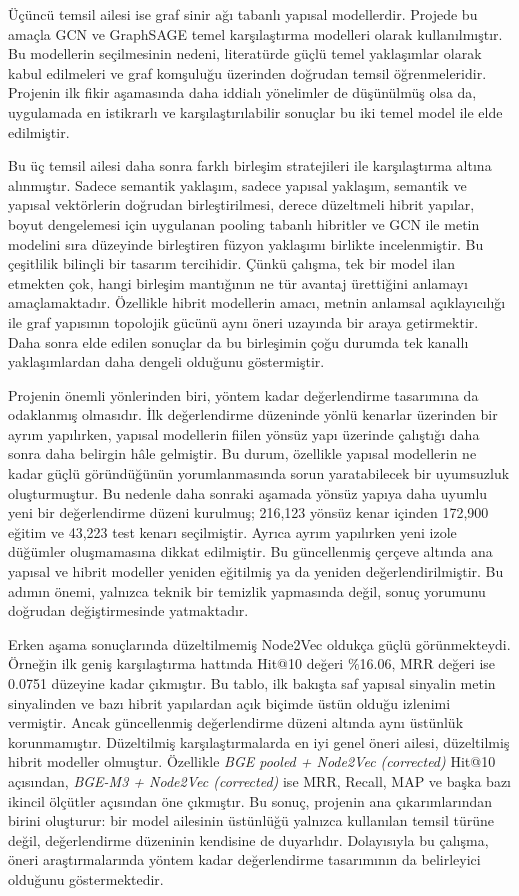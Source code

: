 Üçüncü temsil ailesi ise graf sinir ağı tabanlı yapısal modellerdir.
Projede bu amaçla GCN ve GraphSAGE temel karşılaştırma modelleri olarak
kullanılmıştır. Bu modellerin seçilmesinin nedeni, literatürde güçlü temel
yaklaşımlar olarak kabul edilmeleri ve graf komşuluğu üzerinden doğrudan
temsil öğrenmeleridir. Projenin ilk fikir aşamasında daha iddialı yönelimler
de düşünülmüş olsa da, uygulamada en istikrarlı ve karşılaştırılabilir sonuçlar
bu iki temel model ile elde edilmiştir.

Bu üç temsil ailesi daha sonra farklı birleşim stratejileri ile karşılaştırma
altına alınmıştır. Sadece semantik yaklaşım, sadece yapısal yaklaşım, semantik
ve yapısal vektörlerin doğrudan birleştirilmesi, derece düzeltmeli hibrit
yapılar, boyut dengelemesi için uygulanan pooling tabanlı hibritler ve GCN ile
metin modelini sıra düzeyinde birleştiren füzyon yaklaşımı birlikte
incelenmiştir. Bu çeşitlilik bilinçli bir tasarım tercihidir. Çünkü çalışma,
tek bir model ilan etmekten çok, hangi birleşim mantığının ne tür avantaj
ürettiğini anlamayı amaçlamaktadır. Özellikle hibrit modellerin amacı, metnin
anlamsal açıklayıcılığı ile graf yapısının topolojik gücünü aynı öneri
uzayında bir araya getirmektir. Daha sonra elde edilen sonuçlar da bu
birleşimin çoğu durumda tek kanallı yaklaşımlardan daha dengeli olduğunu
göstermiştir.

Projenin önemli yönlerinden biri, yöntem kadar değerlendirme tasarımına da
odaklanmış olmasıdır. İlk değerlendirme düzeninde yönlü kenarlar üzerinden bir
ayrım yapılırken, yapısal modellerin fiilen yönsüz yapı üzerinde çalıştığı daha
sonra daha belirgin hâle gelmiştir. Bu durum, özellikle yapısal modellerin ne
kadar güçlü göründüğünün yorumlanmasında sorun yaratabilecek bir uyumsuzluk
oluşturmuştur. Bu nedenle daha sonraki aşamada yönsüz yapıya daha uyumlu yeni
bir değerlendirme düzeni kurulmuş; 216,123 yönsüz kenar içinden 172,900 eğitim
ve 43,223 test kenarı seçilmiştir. Ayrıca ayrım yapılırken yeni izole düğümler
oluşmamasına dikkat edilmiştir. Bu güncellenmiş çerçeve altında ana yapısal ve
hibrit modeller yeniden eğitilmiş ya da yeniden değerlendirilmiştir. Bu adımın
önemi, yalnızca teknik bir temizlik yapmasında değil, sonuç yorumunu doğrudan
değiştirmesinde yatmaktadır.

Erken aşama sonuçlarında düzeltilmemiş Node2Vec oldukça güçlü görünmekteydi.
Örneğin ilk geniş karşılaştırma hattında Hit@10 değeri \%16.06, MRR değeri ise
0.0751 düzeyine kadar çıkmıştır. Bu tablo, ilk bakışta saf yapısal sinyalin
metin sinyalinden ve bazı hibrit yapılardan açık biçimde üstün olduğu izlenimi
vermiştir. Ancak güncellenmiş değerlendirme düzeni altında aynı üstünlük
korunmamıştır. Düzeltilmiş karşılaştırmalarda en iyi genel öneri ailesi,
düzeltilmiş hibrit modeller olmuştur. Özellikle \textit{BGE pooled + Node2Vec
(corrected)} Hit@10 açısından, \textit{BGE-M3 + Node2Vec (corrected)} ise MRR,
Recall, MAP ve başka bazı ikincil ölçütler açısından öne çıkmıştır. Bu sonuç,
projenin ana çıkarımlarından birini oluşturur: bir model ailesinin üstünlüğü
yalnızca kullanılan temsil türüne değil, değerlendirme düzeninin kendisine de
duyarlıdır. Dolayısıyla bu çalışma, öneri araştırmalarında yöntem kadar
değerlendirme tasarımının da belirleyici olduğunu göstermektedir.

